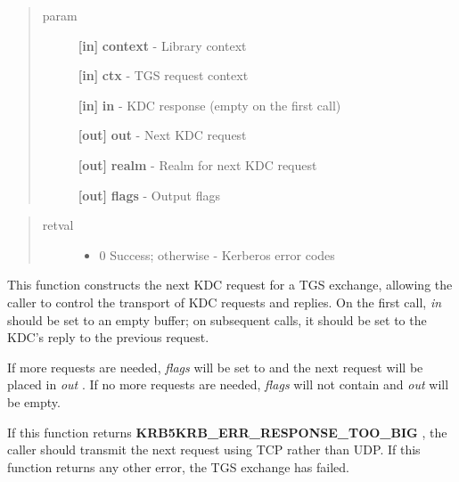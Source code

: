 \documentclass[letterpaper,10pt,english]{sphinxmanual}
\begin{document}
\begin{quote}\begin{description}
\item[{param}] \leavevmode
\textbf{{[}in{]}} \textbf{context} - Library context

\textbf{{[}in{]}} \textbf{ctx} - TGS request context

\textbf{{[}in{]}} \textbf{in} - KDC response (empty on the first call)

\textbf{{[}out{]}} \textbf{out} - Next KDC request

\textbf{{[}out{]}} \textbf{realm} - Realm for next KDC request

\textbf{{[}out{]}} \textbf{flags} - Output flags

\end{description}\end{quote}
\begin{quote}\begin{description}
\item[{retval}] \leavevmode\begin{itemize}
\item {} 
0   Success; otherwise - Kerberos error codes

\end{itemize}

\end{description}\end{quote}

This function constructs the next KDC request for a TGS exchange, allowing the caller to control the transport of KDC requests and replies. On the first call, \emph{in} should be set to an empty buffer; on subsequent calls, it should be set to the KDC's reply to the previous request.

If more requests are needed, \emph{flags} will be set to {\hyperref[appdev/refs/macros/KRB5_TKT_CREDS_STEP_FLAG_CONTINUE:KRB5_TKT_CREDS_STEP_FLAG_CONTINUE]{}} and the next request will be placed in \emph{out} . If no more requests are needed, \emph{flags} will not contain {\hyperref[appdev/refs/macros/KRB5_TKT_CREDS_STEP_FLAG_CONTINUE:KRB5_TKT_CREDS_STEP_FLAG_CONTINUE]{}} and \emph{out} will be empty.

If this function returns \textbf{KRB5KRB\_ERR\_RESPONSE\_TOO\_BIG} , the caller should transmit the next request using TCP rather than UDP. If this function returns any other error, the TGS exchange has failed.
\end{document}
